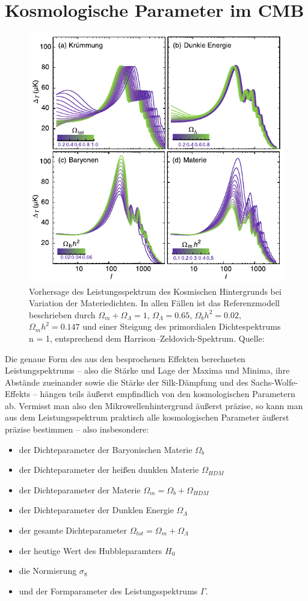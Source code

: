 \documentclass[10pt,a4paper]{article}
\begin{document}
\section{Kosmologische Parameter im CMB}
\begin{figure}[tbhp]
\center
\includegraphics[scale=0.8]{cmbvar}
\caption{Vorhersage des Leistungsspektrum des Kosmischen Hintergrunds bei Variation der Materiedichten. In allen Fällen ist das Referenzmodell beschrieben durch $\Omega_m + \Omega_\Lambda = 1$, $\Omega_\Lambda = 0.65$, $\Omega_b h^2 = 0.02$, $\Omega_m h^2 = 0.147$ und einer Steigung des primordialen Dichtespektrums n = 1, entsprechend dem Harrison–Zeldovich-Spektrum. Quelle: \cite{Schneider}}
\label{cmbvar}
\end{figure}
Die genaue Form des aus den besprochenen Effekten berechneten Leistungspektrums -- also die Stärke und Lage der Maxima und Minima, ihre Abstände zueinander sowie die Stärke der Silk-Dämpfung und des Sachs-Wolfe-Effekts -- hängen teils äußerst empfindlich von den kosmologischen Parametern ab. Vermisst man also den Mikrowellenhintergrund äußerst präzise, so kann man aus dem Leistungsspektrum praktisch alle kosmologischen Parameter äußerst präzise bestimmen -- also insbesondere:
\begin{itemize}
\item der Dichteparameter der Baryonischen Materie $\Omega_b$
\item der Dichteparameter der heißen dunklen Materie $\Omega_{HDM}$
\item der Dichteparameter der Materie $\Omega_m=\Omega_b+\Omega_{HDM}$
\item der Dichteparameter der Dunklen Energie $\Omega_\Lambda$
\item der gesamte Dichteparameter $\Omega_{tot}=\Omega_m+\Omega_\Lambda$
\item der heutige Wert des Hubbleparamters $H_0$
\item die Normierung $\sigma_8$
\item und der Formparameter des Leistungsspektrums $\Gamma$.
\end{itemize}
\end{document}
